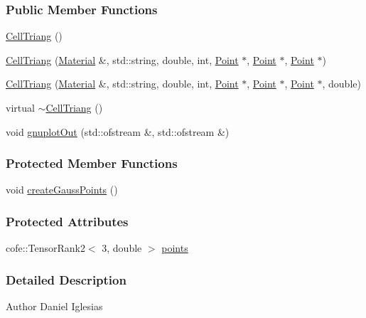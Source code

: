 \subsubsection*{Public Member Functions}
\begin{DoxyCompactItemize}
\item 
\hyperlink{classmknix_1_1_cell_triang_a17a2c3768e9f2aad3a7bfd8041775fb6}{Cell\+Triang} ()
\item 
\hyperlink{classmknix_1_1_cell_triang_a1d988a4f96b2f51d2a617fc105f9539b}{Cell\+Triang} (\hyperlink{classmknix_1_1_material}{Material} \&, std\+::string, double, int, \hyperlink{classmknix_1_1_point}{Point} $\ast$, \hyperlink{classmknix_1_1_point}{Point} $\ast$, \hyperlink{classmknix_1_1_point}{Point} $\ast$)
\item 
\hyperlink{classmknix_1_1_cell_triang_a745b852f45fac5becaeeca26b86123c9}{Cell\+Triang} (\hyperlink{classmknix_1_1_material}{Material} \&, std\+::string, double, int, \hyperlink{classmknix_1_1_point}{Point} $\ast$, \hyperlink{classmknix_1_1_point}{Point} $\ast$, \hyperlink{classmknix_1_1_point}{Point} $\ast$, double)
\item 
virtual \hyperlink{classmknix_1_1_cell_triang_af0a12b3f4f6106291f3252716c4be025}{$\sim$\+Cell\+Triang} ()
\item 
void \hyperlink{classmknix_1_1_cell_triang_a374f66822e2e37d94a2cfe09c5173e8a}{gnuplot\+Out} (std\+::ofstream \&, std\+::ofstream \&)
\end{DoxyCompactItemize}
\subsubsection*{Protected Member Functions}
\begin{DoxyCompactItemize}
\item 
void \hyperlink{classmknix_1_1_cell_triang_a2a2c65fbd2682eba8225473a7dc841f0}{create\+Gauss\+Points} ()
\end{DoxyCompactItemize}
\subsubsection*{Protected Attributes}
\begin{DoxyCompactItemize}
\item 
cofe\+::\+Tensor\+Rank2$<$ 3, double $>$ \hyperlink{classmknix_1_1_cell_triang_a22bff969ea4955bd817c94ae2915e60c}{points}
\end{DoxyCompactItemize}


\subsubsection{Detailed Description}
\begin{DoxyAuthor}{Author}
Daniel Iglesias 
\end{DoxyAuthor}


